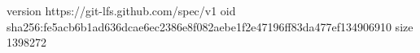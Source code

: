 version https://git-lfs.github.com/spec/v1
oid sha256:fe5acb6b1ad636dcae6ec2386e8f082aebe1f2e47196ff83da477ef134906910
size 1398272
